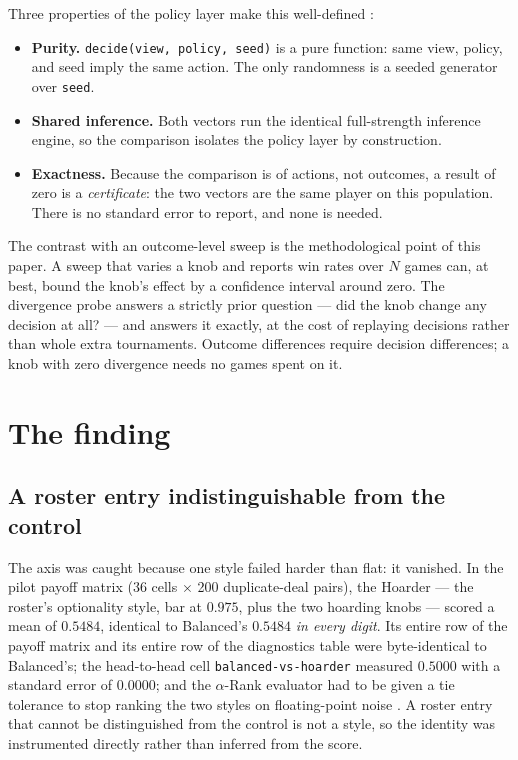 \documentclass[11pt]{article}
\newcommand{\code}[1]{\texttt{#1}}
\begin{document}
Three properties of the policy layer make this well-defined \cite{decide}:

\begin{itemize}
  \item \textbf{Purity.} \code{decide(view, policy, seed)} is a pure function: same view, policy,
  and seed imply the same action. The only randomness is a seeded generator over \code{seed}.
  \item \textbf{Shared inference.} Both vectors run the identical full-strength inference engine,
  so the comparison isolates the policy layer by construction.
  \item \textbf{Exactness.} Because the comparison is of actions, not outcomes, a result of zero
  is a \emph{certificate}: the two vectors are the same player on this population. There is no
  standard error to report, and none is needed.
\end{itemize}

The contrast with an outcome-level sweep is the methodological point of this paper. A sweep that
varies a knob and reports win rates over $N$ games can, at best, bound the knob's effect by a
confidence interval around zero. The divergence probe answers a strictly prior question --- did
the knob change any decision at all? --- and answers it exactly, at the cost of replaying
decisions rather than whole extra tournaments. Outcome differences require decision differences;
a knob with zero divergence needs no games spent on it.

\section{The finding}
\label{sec:finding}

\subsection{A roster entry indistinguishable from the control}

The axis was caught because one style failed harder than flat: it vanished. In the pilot payoff
matrix (36 cells $\times$ 200 duplicate-deal pairs), the Hoarder --- the roster's optionality
style, bar at $0.975$, plus the two hoarding knobs --- scored a mean of $0.5484$, identical to
Balanced's $0.5484$ \emph{in every digit}. Its entire row of the payoff matrix and its entire
row of the diagnostics table were byte-identical to Balanced's; the head-to-head cell
\code{balanced-vs-hoarder} measured $0.5000$ with a standard error of $0.0000$; and the
$\alpha$-Rank evaluator had to be given a tie tolerance to stop ranking the two styles on
floating-point noise \cite{styles, alpharank}. A roster entry that cannot be distinguished from
the control is not a style, so the identity was instrumented directly rather than inferred from
the score.
\end{document}
